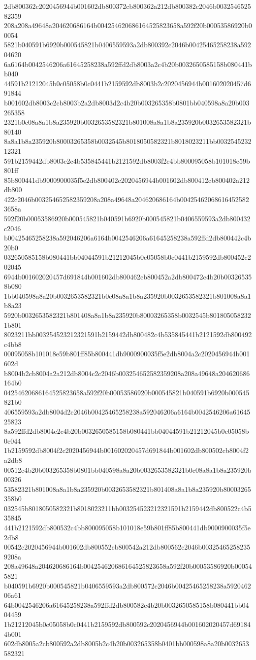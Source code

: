 2db800362c2020456944b001602db800372cb800362a212db800382c2046b003254652582359
208a208a49648a204620686164b004254620686164525823658a592f20b00053586920b00054
5821b040591b6920b000545821b0406559593a2db800392c2046b00425465258238a59204620
6a6164b0042546206a61645258238a592ffd2db8003a2c4b20b0032650585158b080441bb040
44591b21212045b0c05058b0c0441b2159592db8003b2c2020456944b001602020457d691844
b001602db8003c2cb8003b2a2db8003d2c4b20b003265358b0801bb040598a8a20b003265358
2321b0c08a8a1b8a235920b0032653582321b801008a8a1b8a235920b0032653582321b80140
8a8a1b8a235920b80003265358b0032545b8018050582321b8018023211bb003254523212321
591b2159442db8003e2c4b535845441b2121592db8003f2c4bb800095058b101018e59b801ff
85b800441db9000900035f5e2db800402c2020456944b001602db800412cb800402a212db800
422c2046b003254652582359208a208a49648a204620686164b004254620686164525823658a
592f20b00053586920b000545821b040591b6920b000545821b0406559593a2db800432c2046
b00425465258238a592046206a6164b0042546206a61645258238a592ffd2db800442c4b20b0
032650585158b080441bb04044591b21212045b0c05058b0c0441b2159592db800452c202045
6944b001602020457d691844b001602db800462cb800452a2db800472c4b20b003265358b080
1bb040598a8a20b0032653582321b0c08a8a1b8a235920b0032653582321b801008a8a1b8a23
5920b0032653582321b801408a8a1b8a235920b80003265358b0032545b8018050582321b801
8023211bb003254523212321591b2159442db800482c4b535845441b2121592db800492c4bb8
00095058b101018e59b801ff85b800441db9000900035f5e2db8004a2c2020456944b001602d
b8004b2cb8004a2a212db8004c2c2046b003254652582359208a208a49648a204620686164b0
04254620686164525823658a592f20b00053586920b000545821b040591b6920b000545821b0
406559593a2db8004d2c2046b00425465258238a592046206a6164b0042546206a6164525823
8a592ffd2db8004e2c4b20b0032650585158b080441bb04044591b21212045b0c05058b0c044
1b2159592db8004f2c2020456944b001602020457d691844b001602db800502cb8004f2a2db8
00512c4b20b003265358b0801bb040598a8a20b0032653582321b0c08a8a1b8a235920b00326
53582321b801008a8a1b8a235920b0032653582321b801408a8a1b8a235920b80003265358b0
032545b8018050582321b8018023211bb003254523212321591b2159442db800522c4b535845
441b2121592db800532c4bb800095058b101018e59b801ff85b800441db9000900035f5e2db8
00542c2020456944b001602db800552cb800542a212db800562c2046b003254652582359208a
208a49648a204620686164b004254620686164525823658a592f20b00053586920b000545821
b040591b6920b000545821b0406559593a2db800572c2046b00425465258238a592046206a61
64b0042546206a61645258238a592ffd2db800582c4b20b0032650585158b080441bb0404459
1b21212045b0c05058b0c0441b2159592db800592c2020456944b001602020457d691844b001
602db8005a2cb800592a2db8005b2c4b20b003265358b0401bb000598a8a20b0032653582321
